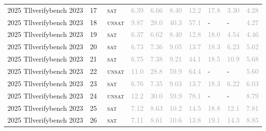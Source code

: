 \begin{center}
{\begin{longtable}{@{}llllllllll@{}}
2025 Tllverifybench 2023 & 17 & ~\textsc{sat} & \textcolor{darkgray}{6.39} & \textcolor{darkgray}{6.66} & \textcolor{darkgray}{8.40} & \textcolor{darkgray}{12.2} & \textcolor{darkgray}{17.8} & \textcolor{darkgray}{3.30} & \textcolor{darkgray}{4.28} \\
2025 Tllverifybench 2023 & 18 & ~\textsc{unsat} & \textcolor{darkgray}{9.87} & \textcolor{darkgray}{28.0} & \textcolor{darkgray}{40.3} & \textcolor{darkgray}{57.1} & - & - & \textcolor{darkgray}{4.27} \\
2025 Tllverifybench 2023 & 19 & ~\textsc{sat} & \textcolor{darkgray}{6.37} & \textcolor{darkgray}{6.62} & \textcolor{darkgray}{8.40} & \textcolor{darkgray}{12.8} & \textcolor{darkgray}{18.0} & \textcolor{darkgray}{4.54} & \textcolor{darkgray}{4.46} \\
2025 Tllverifybench 2023 & 20 & ~\textsc{sat} & \textcolor{darkgray}{6.73} & \textcolor{darkgray}{7.36} & \textcolor{darkgray}{9.05} & \textcolor{darkgray}{13.7} & \textcolor{darkgray}{18.3} & \textcolor{darkgray}{6.23} & \textcolor{darkgray}{5.62} \\
2025 Tllverifybench 2023 & 21 & ~\textsc{sat} & \textcolor{darkgray}{6.75} & \textcolor{darkgray}{7.38} & \textcolor{darkgray}{9.21} & \textcolor{darkgray}{44.1} & \textcolor{darkgray}{18.5} & \textcolor{darkgray}{10.9} & \textcolor{darkgray}{5.68} \\
2025 Tllverifybench 2023 & 22 & ~\textsc{unsat} & \textcolor{darkgray}{11.0} & \textcolor{darkgray}{28.8} & \textcolor{darkgray}{59.9} & \textcolor{darkgray}{64.4} & - & - & \textcolor{darkgray}{5.60} \\
2025 Tllverifybench 2023 & 23 & ~\textsc{sat} & \textcolor{darkgray}{6.76} & \textcolor{darkgray}{7.35} & \textcolor{darkgray}{9.03} & \textcolor{darkgray}{13.7} & \textcolor{darkgray}{18.3} & \textcolor{darkgray}{6.22} & \textcolor{darkgray}{6.03} \\
2025 Tllverifybench 2023 & 24 & ~\textsc{unsat} & \textcolor{darkgray}{12.2} & \textcolor{darkgray}{30.0} & \textcolor{darkgray}{59.9} & \textcolor{darkgray}{78.1} & - & - & \textcolor{darkgray}{8.79} \\
2025 Tllverifybench 2023 & 25 & ~\textsc{sat} & \textcolor{darkgray}{7.12} & \textcolor{darkgray}{8.63} & \textcolor{darkgray}{10.2} & \textcolor{darkgray}{14.5} & \textcolor{darkgray}{18.8} & \textcolor{darkgray}{12.1} & \textcolor{darkgray}{7.81} \\
2025 Tllverifybench 2023 & 26 & ~\textsc{sat} & \textcolor{darkgray}{7.11} & \textcolor{darkgray}{8.61} & \textcolor{darkgray}{10.6} & \textcolor{darkgray}{13.8} & \textcolor{darkgray}{19.1} & \textcolor{darkgray}{14.3} & \textcolor{darkgray}{8.85} \\

\end{longtable}}
\end{center}
